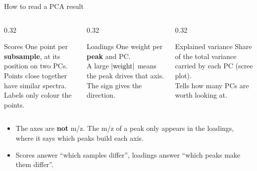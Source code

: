 \documentclass[aspectratio=169,10pt]{beamer}
\newcommand{\hl}[1]{{\color{warm}\bfseries #1}}
\begin{document}
\begin{frame}{How to read a PCA result}
  \begin{columns}[T]
    \begin{column}{0.32\textwidth}
      \begin{block}{Scores}
        One point per \hl{subsample}, at its position on two PCs.\\[1mm]
        Points close together have similar spectra. Labels only colour the points.
      \end{block}
    \end{column}
    \begin{column}{0.32\textwidth}
      \begin{block}{Loadings}
        One weight per \hl{peak} and PC.\\[1mm]
        A large $|{\rm weight}|$ means the peak drives that axis. The sign gives the direction.
      \end{block}
    \end{column}
    \begin{column}{0.32\textwidth}
      \begin{block}{Explained variance}
        Share of the total variance carried by each PC (scree plot).\\[1mm]
        Tells how many PCs are worth looking at.
      \end{block}
    \end{column}
  \end{columns}
  \vspace{4mm}
  \begin{itemize}\setlength\itemsep{2mm}
    \item The axes are \hl{not} m/z. The m/z of a peak only appears in the loadings, where it says which peaks build each axis.
    \item Scores answer ``which samples differ'', loadings answer ``which peaks make them differ''.
  \end{itemize}
\end{frame}
\end{document}
